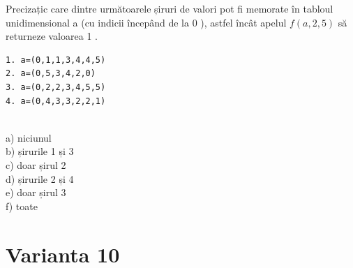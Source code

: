 Precizațic care dintre următoarele șiruri de valori pot fi memorate în tabloul unidimensional a (cu indicii începând de la 0 ), astfel încât apelul $f(a, 2,5)$ să returneze valoarea 1 .
\begin{verbatim}
1. a=(0,1,1,3,4,4,5)
2. a=(0,5,3,4,2,0)
3. a=(0,2,2,3,4,5,5)
4. a=(0,4,3,3,2,2,1)
\end{verbatim}
\\
a) niciunul
\\
b) șirurile 1 și 3
\\
c) doar șirul 2
\\
d) șirurile 2 și 4
\\
e) doar șirul 3
\\
f) toate
\\

\section*{Varianta 10}

